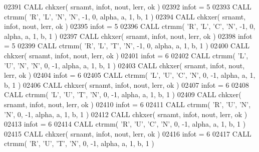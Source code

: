 \begin{DoxyCode}
02391       \textcolor{keyword}{CALL }chkxer( srnamt, infot, nout, lerr, ok )
02392       infot = 5
02393       \textcolor{keyword}{CALL }ctrmm( \textcolor{stringliteral}{'R'}, \textcolor{stringliteral}{'L'}, \textcolor{stringliteral}{'N'}, \textcolor{stringliteral}{'N'}, -1, 0, alpha, a, 1, b, 1 )
02394       \textcolor{keyword}{CALL }chkxer( srnamt, infot, nout, lerr, ok )
02395       infot = 5
02396       \textcolor{keyword}{CALL }ctrmm( \textcolor{stringliteral}{'R'}, \textcolor{stringliteral}{'L'}, \textcolor{stringliteral}{'C'}, \textcolor{stringliteral}{'N'}, -1, 0, alpha, a, 1, b, 1 )
02397       \textcolor{keyword}{CALL }chkxer( srnamt, infot, nout, lerr, ok )
02398       infot = 5
02399       \textcolor{keyword}{CALL }ctrmm( \textcolor{stringliteral}{'R'}, \textcolor{stringliteral}{'L'}, \textcolor{stringliteral}{'T'}, \textcolor{stringliteral}{'N'}, -1, 0, alpha, a, 1, b, 1 )
02400       \textcolor{keyword}{CALL }chkxer( srnamt, infot, nout, lerr, ok )
02401       infot = 6
02402       \textcolor{keyword}{CALL }ctrmm( \textcolor{stringliteral}{'L'}, \textcolor{stringliteral}{'U'}, \textcolor{stringliteral}{'N'}, \textcolor{stringliteral}{'N'}, 0, -1, alpha, a, 1, b, 1 )
02403       \textcolor{keyword}{CALL }chkxer( srnamt, infot, nout, lerr, ok )
02404       infot = 6
02405       \textcolor{keyword}{CALL }ctrmm( \textcolor{stringliteral}{'L'}, \textcolor{stringliteral}{'U'}, \textcolor{stringliteral}{'C'}, \textcolor{stringliteral}{'N'}, 0, -1, alpha, a, 1, b, 1 )
02406       \textcolor{keyword}{CALL }chkxer( srnamt, infot, nout, lerr, ok )
02407       infot = 6
02408       \textcolor{keyword}{CALL }ctrmm( \textcolor{stringliteral}{'L'}, \textcolor{stringliteral}{'U'}, \textcolor{stringliteral}{'T'}, \textcolor{stringliteral}{'N'}, 0, -1, alpha, a, 1, b, 1 )
02409       \textcolor{keyword}{CALL }chkxer( srnamt, infot, nout, lerr, ok )
02410       infot = 6
02411       \textcolor{keyword}{CALL }ctrmm( \textcolor{stringliteral}{'R'}, \textcolor{stringliteral}{'U'}, \textcolor{stringliteral}{'N'}, \textcolor{stringliteral}{'N'}, 0, -1, alpha, a, 1, b, 1 )
02412       \textcolor{keyword}{CALL }chkxer( srnamt, infot, nout, lerr, ok )
02413       infot = 6
02414       \textcolor{keyword}{CALL }ctrmm( \textcolor{stringliteral}{'R'}, \textcolor{stringliteral}{'U'}, \textcolor{stringliteral}{'C'}, \textcolor{stringliteral}{'N'}, 0, -1, alpha, a, 1, b, 1 )
02415       \textcolor{keyword}{CALL }chkxer( srnamt, infot, nout, lerr, ok )
02416       infot = 6
02417       \textcolor{keyword}{CALL }ctrmm( \textcolor{stringliteral}{'R'}, \textcolor{stringliteral}{'U'}, \textcolor{stringliteral}{'T'}, \textcolor{stringliteral}{'N'}, 0, -1, alpha, a, 1, b, 1 )

\end{DoxyCode}
